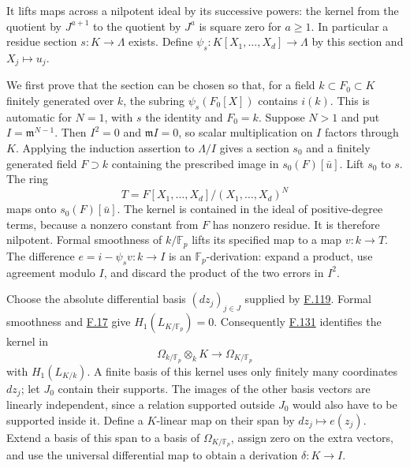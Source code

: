 \documentclass[11pt,a4paper,openany]{report}
\begin{document}
It lifts maps across a nilpotent ideal by its successive powers: the kernel from the quotient by \(J^{a+1}\) to the quotient by \(J^a\) is square zero for \(a\ge1\). In particular a residue section \(s:K\to\Lambda\) exists. Define \(\psi_s:K[X_1,\ldots,X_d]\to\Lambda\) by this section and \(X_j\mapsto u_j\).

We first prove that the section can be chosen so that, for a field \(k\subset F_0\subset K\) finitely generated over \(k\), the subring \(\psi_s(F_0[X])\) contains \(i(k)\). This is automatic for \(N=1\), with \(s\) the identity and \(F_0=k\). Suppose \(N>1\) and put \(I=\mathfrak m^{N-1}\). Then \(I^2=0\) and \(\mathfrak m I=0\), so scalar multiplication on \(I\) factors through \(K\). Applying the induction assertion to \(\Lambda/I\) gives a section \(s_0\) and a finitely generated field \(F\supset k\) containing the prescribed image in \(s_0(F)[\bar u]\). Lift \(s_0\) to \(s\). The ring \[
T=F[X_1,\ldots,X_d]/(X_1,\ldots,X_d)^N
\] maps onto \(s_0(F)[\bar u]\). The kernel is contained in the ideal of positive-degree terms, because a nonzero constant from \(F\) has nonzero residue. It is therefore nilpotent. Formal smoothness of \(k/\mathbb F_p\) lifts its specified map to a map \(v:k\to T\). The difference \(e=i-\psi_s v:k\to I\) is an \(\mathbb F_p\)-derivation: expand a product, use agreement modulo \(I\), and discard the product of the two errors in \(I^2\).

Choose the absolute differential basis \((dz_j)_{j\in J}\) supplied by \hyperref[AG-RG-S05-more-algebra-lemma-p-basis]{F.119}. Formal smoothness and \hyperref[AG-RG-S05-algebra-lemma-characterize-formally-smooth-field-extension]{F.17} give \(H_1(L_{K/\mathbb F_p})=0\). Consequently \hyperref[AG-RG-S05-more-algebra-lemma-transitivity-gamma]{F.131} identifies the kernel in \[
\Omega_{k/\mathbb F_p}\otimes_kK\longrightarrow\Omega_{K/\mathbb F_p}
\] with \(H_1(L_{K/k})\). A finite basis of this kernel uses only finitely many coordinates \(dz_j\); let \(J_0\) contain their supports. The images of the other basis vectors are linearly independent, since a relation supported outside \(J_0\) would also have to be supported inside it. Define a \(K\)-linear map on their span by \(dz_j\mapsto e(z_j)\). Extend a basis of this span to a basis of \(\Omega_{K/\mathbb F_p}\), assign zero on the extra vectors, and use the universal differential map to obtain a derivation \(\delta:K\to I\).
\end{document}
